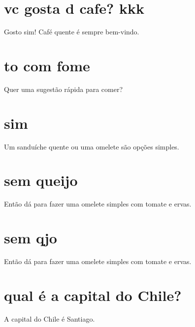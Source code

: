 \documentclass[11pt,a4paper]{article}
\begin{document}
\section{vc gosta d cafe? kkk}
Gosto sim! Café quente é sempre bem-vindo.

\section{to com fome}
Quer uma sugestão rápida para comer?

\section{sim}
Um sanduíche quente ou uma omelete são opções simples.

\section{sem queijo}
Então dá para fazer uma omelete simples com tomate e ervas.

\section{sem qjo}
Então dá para fazer uma omelete simples com tomate e ervas.

\section{qual é a capital do Chile?}
A capital do Chile é Santiago.
\end{document}
